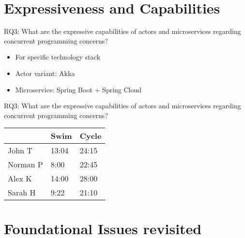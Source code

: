 \documentclass{beamer}
\begin{document}

\section{Expressiveness and Capabilities}


\begin{frame}{RQ3: What are the expressive capabilities of actors and microservices regarding concurrent programming concerns?}

\begin{itemize}
  \item For specific technology stack
  \item Actor variant: Akka
  \item Microservice: Spring Boot $+$ Spring Cloud
\end{itemize}

\end{frame}


\begin{frame}{RQ3: What are the expressive capabilities of actors and microservices regarding concurrent programming concerns?}


\begin{table}
  \begin{tabular}{l l l}
            & Swim & Cycle \\ \hline
    John T & 13:04 & 24:15 \\ 
    Norman P & 8:00 & 22:45 \\
    Alex K & 14:00 & 28:00\\
    Sarah H & 9:22 & 21:10 
  \end{tabular}
\end{table}

\end{frame}


\section{Foundational Issues revisited}

\end{document}
